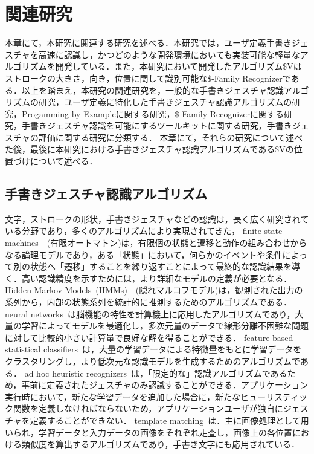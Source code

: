 \chapter{関連研究}
本章にて，本研究に関連する研究を述べる．本研究では，ユーザ定義手書きジェスチャを高速に認識し，かつどのような開発環境においても実装可能な軽量なアルゴリズムを開発している．また，本研究において開発したアルゴリズム\$Vはストロークの大きさ，向き，位置に関して識別可能な\$-Family Recognizerである．以上を踏まえ，本研究の関連研究を，一般的な手書きジェスチャ認識アルゴリズムの研究，ユーザ定義に特化した手書きジェスチャ認識アルゴリズムの研究，Progamming by Exampleに関する研究，\$-Family Recognizerに関する研究，手書きジェスチャ認識を可能にするツールキットに関する研究，手書きジェスチャの評価に関する研究に分類する．
本章にて，それらの研究について述べた後，最後に本研究における手書きジェスチャ認識アルゴリズムである\$Vの位置づけについて述べる．

\section{手書きジェスチャ認識アルゴリズム}
文字，ストロークの形状，手書きジェスチャなどの認識は，長く広く研究されている分野であり，多くのアルゴリズムにより実現されてきた，
finite state machines~\cite{Hong00constructingfinite}~(有限オートマトン)は，有限個の状態と遷移と動作の組み合わせからなる論理モデルであり，ある「状態」において，何らかのイベントや条件によって別の状態へ「遷移」することを繰り返すことによって最終的な認識結果を導く．高い認識精度を示すためには，より詳細なモデルの定義が必要となる．
Hidden Markov Models~(HMMs)~\cite{Anderson2004HiddenMM,Sezgin:2005:HES:1040830.1040899, Cao:2005:EOA:1089508.1089540}~(隠れマルコフモデル)は，観測された出力の系列から，内部の状態系列を統計的に推測するためのアルゴリズムである．
neural networks~\cite{Pittman:1991:RHT:108844.108914}は脳機能の特性を計算機上に応用したアルゴリズムであり，大量の学習によってモデルを最適化し，多次元量のデータで線形分離不困難な問題に対して比較的小さい計算量で良好な解を得ることができる．
feature-based statistical classifiers~\cite{Cho:2006:NGR:1711617.1711649,Rubine:1991:SGE:127719.122753}は，大量の学習データによる特徴量をもとに学習データをクラスタリングし，より低次元な認識モデルを生成するためのアルゴリズムである．
ad hoc heuristic recognizers~\cite{Anthony:2010:LMR:1839214.1839258, Wilson:2003:XUI:642611.642706}は，「限定的な」認識アルゴリズムであるため，事前に定義されたジェスチャのみ認識することができる．アプリケーション実行時において，新たな学習データを追加した場合に，新たなヒューリスティック関数を定義しなければならないため，アプリケーションユーザが独自にジェスチャを定義することができない．
template matching~\cite{Kara:2005:ITS:1652319.1652712, Kristensson:2004:SLV:1029632.1029640}は．主に画像処理として用いられ，学習データと入力データの画像をそれぞれ走査し，画像上の各位置における類似度を算出するアルゴリズムであり，手書き文字にも応用されている．

